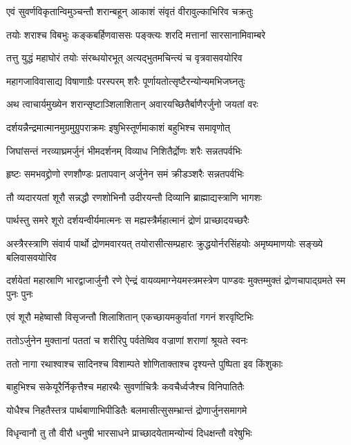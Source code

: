 \twolineshloka
{एवं सुवर्णविकृतान्विमुञ्चन्तौ शरान्बहून्}
{आकाशं संवृतं वीरावुल्काभिरिव चक्रतुः}


\twolineshloka
{तयोः शराश्च विबभुः कङ्कबर्हिणवाससः}
{पङ्क्त्यः शरदि मत्तानां सारसानामिवाम्बरे}


\twolineshloka
{तत्तु युद्धं महाघोरं तयोः संरब्धयोरभूत्}
{अत्यद्भुतमचिन्त्यं च वृत्रवासवयोरिव}


\twolineshloka
{महागजाविवासाद्य विषाणाग्रैः परस्परम्}
{शरैः पूर्णायतोत्सृष्टैरन्योन्यमभिजघ्नतुः}


\twolineshloka
{अथ त्वाचार्यमुख्येन शरान्सृष्टाञ्शिलाशितान्}
{अवारयच्छितैर्बाणैरर्जुनो जयतां वरः}


\twolineshloka
{दर्शयन्नैन्द्रमात्मानमुग्रमुग्रुपराक्रमः}
{इषुभिस्तूर्णमाकाशं बहुभिश्च समावृणोत्}



\twolineshloka
{जिघांसन्तं नरव्याघ्रमर्जुनं भीमदर्शनम्}
{विव्याध निशितैर्द्रोणः शरैः सन्नतपर्वभिः}


\twolineshloka
{हृष्टः समभवद्द्रोणो रणशौण्डः प्रतापवान्}
{अर्जुनेन समं क्रीडञ्शरैः सन्नतपर्वभिः}


\twolineshloka
{तौ व्यदारयतां शूरौ सन्नद्धौ रणशोभिनौ}
{उदीरयन्तौ दिव्यानि ब्राह्माद्यस्त्राणि भागशः}


\twolineshloka
{पार्थस्तु समरे शूरो दर्शयन्वीर्यमात्मनः}
{स मह्यस्त्रैर्महात्मानं द्रोणं प्राच्छादयच्छरैः}


\onelineshloka
{अस्त्रैरस्त्राणि संवार्य पार्थो द्रोणमवारयत्}
\twolineshloka
{तयोरासीत्सम्प्रहारः क्रुद्धयोर्नरसिंहयोः}
{अमृष्यमाणयोः सङ्ख्ये बलिवासवयोरिव}


\onelineshloka
{दर्शयेतां महास्राणि भारद्वाजार्जुनौ रणे}
\twolineshloka
{ऐन्द्रं वायव्यमाग्नेयमस्त्रमस्त्रेण पाण्डवः}
{मुक्तम्मुक्तं द्रोणचापाद्ग्रमते स्म पुनः पुनः}


\twolineshloka
{एवं शूरौ महेष्वासौ विसृजन्तौ शिलाशितान्}
{एकच्छायमकुर्वातां गगनं शरवृष्टिभिः}


\twolineshloka
{ततोऽर्जुनेन मुक्तानां पततां च शरीरिपु}
{पर्वतेष्विव वज्राणां शराणां श्रूयते स्वनः}


\twolineshloka
{ततो नागा रथाश्वाश्च सादिनश्च विशाम्पते}
{शोणिताक्ताश्च दृश्यन्ते पुष्पिता इव किंशुकाः}


\twolineshloka
{बाहुभिश्च सकेयूरैर्निकृत्तैश्च महारथैः}
{सुवर्णाचित्रैः कवचैर्ध्वजैश्च विनिपातितैः}


\twolineshloka
{योधैश्च निहतैस्तत्र पार्थबाणाभिपीडितैः}
{बलमासीत्सुसम्भ्रान्तं द्रोणार्जुनसमागमे}


\twolineshloka
{विधृन्वानौ तु तौ वीरौ धनुषी भारसाधने}
{प्राच्छादयेतामन्योन्यं दिधक्षन्तौ वरेषुभिः}


